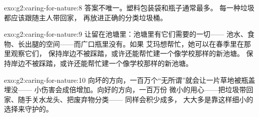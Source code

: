\begin{solution}{exo:g2:caring-for-nature:8}
答案不唯一。塑料包装袋和瓶子通常最多。
每一种垃圾都应该跟随主人带回家，
再放进正确的分类垃圾桶。
\end{solution}

\begin{solution}{exo:g2:caring-for-nature:9}
让留在池塘里：池塘里有它们需要的一切——
池水、食物、长出腿的空间——而广口瓶里没有。如果
艾玛想帮忙，她可以在春季里在那里观察它们，
保持岸边不被踩踏，或许还能帮忙建一个像学校那样的新池塘。
保持岸边不被踩踏，或许还能帮忙建一个像学校那样的新池塘。
\end{solution}

\begin{solution}{exo:g2:caring-for-nature:10}
向坏的方向，一百万个“无所谓”就会让一片草地被瓶盖埋没——
小伤害会成倍增加。向好的方向，一百万份
微小的用心——把垃圾带回家、随手关水龙头、把废弃物分类——
同样会积少成多，
大大多是靠这样细小的选择来守护的。
\end{solution}
